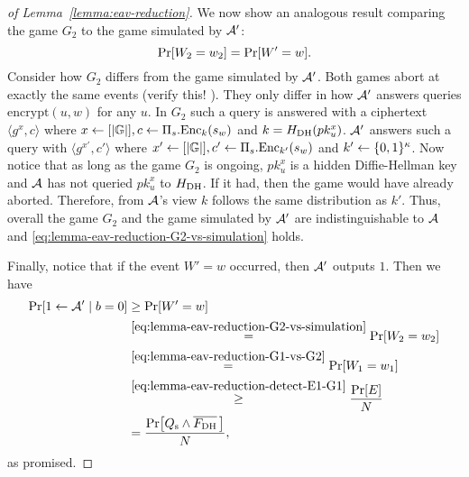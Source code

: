 \begin{proof}[of Lemma~\ref{lemma:eav-reduction}]
	We now show an analogous result comparing the game $G_2$ to the game simulated by $\mathcal{A}'$:
	\begin{equation} \label{eq:lemma-eav-reduction-G2-vs-simulation}
		\pr{W_2 = w_2} = \pr{W' = w}.
	\end{equation}
	Consider how $G_2$ differs from the game simulated by $\mathcal{A}'$. Both games abort at exactly the same events (verify this! ). They only differ in how $\mathcal{A}'$ answers queries $\mathrm{encrypt}(u, w)$ for any $u$. In $G_2$ such a query is answered with a ciphertext $\langle g^x, c \rangle$ where $x \leftarrow [\lvert\mathbb{G}\rvert], c \leftarrow \Pi_s.\mathrm{Enc}_k(s_w)$ and $k = H_\mathrm{DH}(pk_u^x)$. $\mathcal{A}'$ answers such a query with $\langle g^{x'}, c' \rangle$ where $x' \leftarrow [\lvert\mathbb{G}\rvert], c' \leftarrow \Pi_s.\mathrm{Enc}_{k'}(s_w)$ and $k' \leftarrow \{0, 1\}^\kappa$. Now notice that as long as the game $G_2$ is ongoing, $pk_u^{x}$ is a hidden Diffie-Hellman key and $\mathcal{A}$ has not queried $pk_u^{x}$ to $H_\mathrm{DH}$. If it had, then the game would have already aborted. Therefore, from $\mathcal{A}$'s view $k$ follows the same distribution as $k'$. Thus, overall the game $G_2$ and the game simulated by $\mathcal{A}'$ are indistinguishable to $\mathcal{A}$ and \eqref{eq:lemma-eav-reduction-G2-vs-simulation} holds.

	Finally, notice that if the event $W' = w$ occurred, then $\mathcal{A}'$ outputs $1$. Then we have
	\begin{align*}
		\pr{1 \from \adv' \mid b = 0} & \ge \pr{W' = w}                                                              \\
		                            & \stackrel{\eqref{eq:lemma-eav-reduction-G2-vs-simulation}}{=} \pr{W_2 = w_2} \\
		                            & \stackrel{\eqref{eq:lemma-eav-reduction-G1-vs-G2}}{=}  \pr{W_1 = w_1}        \\
		                            & \stackrel{\eqref{eq:lemma-eav-reduction-detect-E1-G1}}{\ge} \frac{\pr{E}}{N} \\
		                            & = \frac{\pr{\qs \land \overline{\fdh}\,}}{N},
	\end{align*}
	as promised.


\end{proof}
